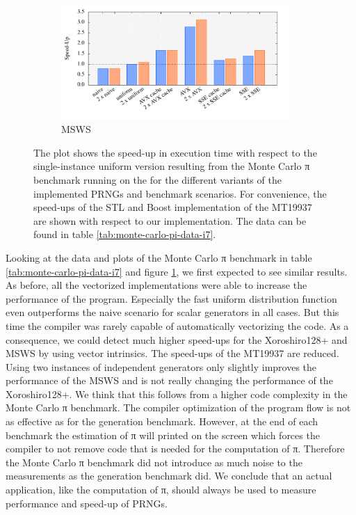 \documentclass{stdlocal}
\begin{document}
\begin{figure}
      \begin{subfigure}[b]{\textwidth}
        \center
        \includegraphics[width=0.95\textwidth]{plots/monte_carlo_pi_desktop_msws.pdf}
        \caption{MSWS}
      \end{subfigure}
      \caption[Monte Carlo π Benchmark Speed-Up for ]{%
        The plot shows the speed-up in execution time with respect to the single-instance uniform version resulting from the Monte Carlo π benchmark running on the  for the different variants of the implemented PRNGs and benchmark scenarios.
        For convenience, the speed-ups of the STL and Boost implementation of the MT19937 are shown with respect to our implementation.
        The data can be found in table \ref{tab:monte-carlo-pi-data-i7}.
      }
      \label{fig:monte-carlo-pi-speedup-i7}
    \end{figure}

    Looking at the data and plots of the Monte Carlo π benchmark in table \ref{tab:monte-carlo-pi-data-i7} and figure \ref{fig:monte-carlo-pi-speedup-i7}, we first expected to see similar results.
    As before, all the vectorized implementations were able to increase the performance of the program.
    Especially the fast uniform distribution function even outperforms the naive scenario for scalar generators in all cases.
    But this time the compiler was rarely capable of automatically vectorizing the code.
    As a consequence, we could detect much higher speed-ups for the Xoroshiro128+ and MSWS by using vector intrinsics.
    The speed-ups of the MT19937 are reduced.
    Using two instances of independent generators only slightly improves the performance of the MSWS and is not really changing the performance of the Xoroshiro128+.
    We think that this follows from a higher code complexity in the Monte Carlo π benchmark.
    The compiler optimization of the program flow is not as effective as for the generation benchmark.
    However, at the end of each benchmark the estimation of π will printed on the screen which forces the compiler to not remove code that is needed for the computation of π.
    Therefore the Monte Carlo π benchmark did not introduce as much noise to the measurements as the generation benchmark did.
    We conclude that an actual application, like the computation of π, should always be used to measure performance and speed-up of PRNGs.
\end{document}
